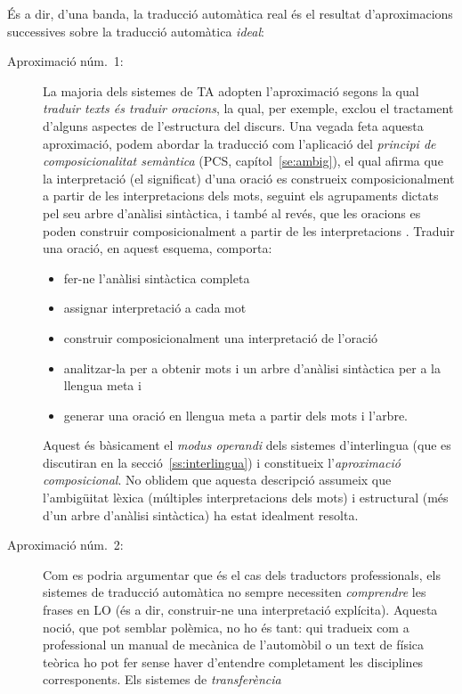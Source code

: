 És a dir, d'una banda, la traducció automàtica real és el resultat
d'aproximacions successives sobre la traducció automàtica \emph{ideal}:
\begin{description}
\item[Aproximació núm.\ 1:] La majoria dels sistemes de TA adopten
  l'aproximació segons la qual \emph{traduir texts és traduir
    oracions}, la qual, per exemple, exclou el tractament d'alguns
  aspectes de l'estructura del discurs. Una vegada feta aquesta
  aproximació, podem abordar la traducció com l'aplicació del
  \emph{principi de composicionalitat semàntica} (PCS,
  capítol~\ref{se:ambig}), el qual afirma que la interpretació (el
  significat) d'una oració es construeix composicionalment a partir de
  les interpretacions dels mots, seguint els agrupaments dictats pel
  seu arbre d'anàlisi sintàctica, i també al revés, que les oracions
  es poden construir composicionalment a partir de les interpretacions
  \citep{tellier00p}. Traduir una oració, en aquest esquema, comporta:
  \begin{itemize}
  \item fer-ne l'anàlisi sintàctica completa
  \item assignar interpretació a cada mot
  \item construir composicionalment una interpretació de l'oració
  \item analitzar-la per a obtenir mots i un arbre d'anàlisi
    sintàctica per a la llengua meta i
  \item generar una oració en llengua meta a partir dels mots i
    l'arbre.
  \end{itemize}
  Aquest és bàsicament el \emph{modus
    operandi} dels sistemes d'interlingua (que es discutiran en la secció~\ref{ss:interlingua}) i constitueix
    l'\emph{aproximació composicional}. No oblidem que aquesta
    descripció assumeix que l'ambigüitat lèxica (múltiples
    interpretacions dels mots) i estructural (més d'un arbre d'anàlisi
    sintàctica) ha estat
    idealment resolta.
  \item[Aproximació núm.\ 2:] Com es podria argumentar que és el cas
    dels traductors professionals, els sistemes de traducció
    automàtica no sempre necessiten \emph{comprendre} les frases en LO
    (és a dir, construir-ne una interpretació explícita). Aquesta
    noció, que pot semblar polèmica, no ho és tant: qui tradueix com a
    professional un manual de mecànica de l'automòbil o un text de
    física teòrica ho pot fer sense haver d'entendre completament les
    disciplines corresponents. Els sistemes de \emph{transferència}

\end{description}
